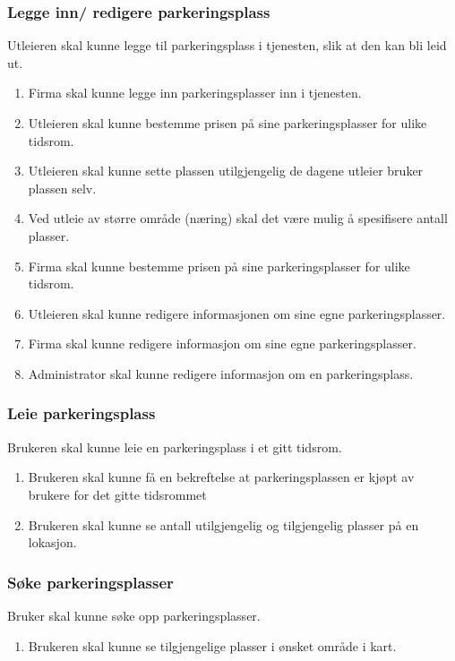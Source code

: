 \subsubsection{Legge inn/ redigere parkeringsplass}
\label{Legge_parkering}
Utleieren skal kunne legge til parkeringsplass i tjenesten, slik at den kan bli leid ut.
\begin{enumerate}[label=(\alph*)]
    \item Firma skal kunne legge inn parkeringsplasser inn i tjenesten.
    \item Utleieren skal kunne bestemme prisen på sine parkeringsplasser for ulike tidsrom.
    \item Utleieren skal kunne sette plassen utilgjengelig de dagene utleier bruker plassen selv.
    \item Ved utleie av større område (næring) skal det være mulig å spesifisere antall plasser.
    \item Firma skal kunne bestemme prisen på sine parkeringsplasser for ulike tidsrom.
    \item Utleieren skal kunne redigere informasjonen om sine egne parkeringsplasser.
    \item Firma skal kunne redigere informasjon om sine egne  parkeringsplasser.
    \item Administrator skal kunne redigere informasjon om en parkeringsplass.
\end{enumerate}


\subsubsection{Leie parkeringsplass}
\label{leie_park}
Brukeren skal kunne leie en parkeringsplass i et gitt tidsrom.
\begin{enumerate}[label=(\alph*)]
    \item Brukeren skal kunne få en bekreftelse at parkeringsplassen er kjøpt av brukere for det gitte tidsrommet
    \item Brukeren skal kunne se antall utilgjengelig og tilgjengelig plasser på en lokasjon.
\end{enumerate}


\subsubsection{Søke parkeringsplasser}
\label{søke_park}
Bruker skal kunne søke opp parkeringsplasser.
\begin{enumerate}[label=(\alph*)]
   \item Brukeren skal kunne se tilgjengelige plasser i ønsket område i kart.
\end{enumerate}

